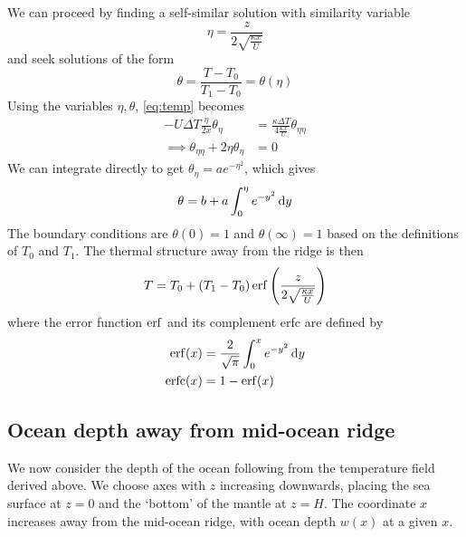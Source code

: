 \documentclass{jknotes}
\begin{document}
We can proceed by finding a self-similar solution with similarity variable
\begin{equation}
	\eta = \frac{z}{2\sqrt{\frac{\kappa x}{U}}}
\end{equation}
and seek solutions of the form
\begin{equation}
	\theta = \frac{T - T_0}{T_1-T_0} = \theta(\eta)
\end{equation}
Using the variables $\eta, \theta$, \eqref{eq:temp} becomes
\begin{align}
	-U\Delta T \frac{\eta}{2x} \theta_\eta &= \frac{\kappa \Delta T}{4
	\frac{\kappa x}{U}} \theta_{\eta\eta}\\
		\implies \theta_{\eta\eta} + 2\eta\theta_\eta &= 0
\end{align}
We can integrate directly to get $\theta_\eta = ae^{-\eta^2}$, which gives
\begin{equation}
	\theta = b + a \int_0^\eta e^{-y^2} \, \diffd y
\end{equation}
The boundary conditions are $\theta(0) = 1$ and $\theta(\infty) = 1$ based on
the definitions of $T_0$ and $T_1$. The thermal structure away from the ridge
is then
\begin{equation}
	T = T_0 + (T_1-T_0) \erf\left( \frac{z}{2\sqrt{\frac{\kappa x}{U}}}\right)
	\label{eq:T}
\end{equation}
where the error function $\erf$ and its complement erfc are defined by
\begin{align}
	\erf(x) &= \frac{2}{\sqrt{\pi}} \int_0^x e^{-y^2} \, \diffd y \\
	\text{erfc}(x) &= 1 - \erf(x)
\end{align}

\subsection{Ocean depth away from mid-ocean ridge}
We now consider the depth of the ocean following from the temperature field
derived above. We choose axes with $z$ increasing downwards, placing the sea
surface at $z=0$ and the `bottom' of the mantle at $z=H$. The coordinate $x$
increases away from the mid-ocean ridge, with ocean depth $w(x)$ at a given
$x$.
\end{document}

